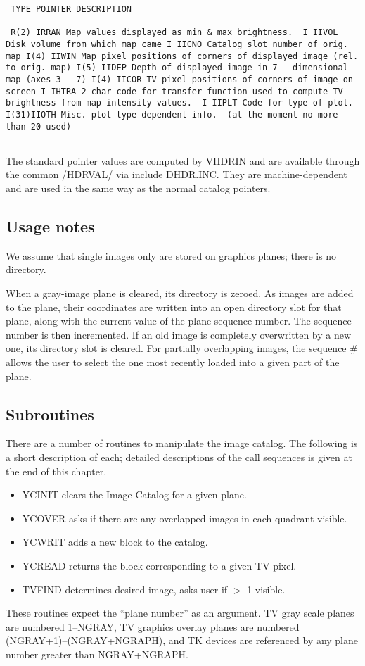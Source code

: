 \begin{verbatim}
 TYPE POINTER DESCRIPTION

 R(2) IRRAN Map values displayed as min & max brightness.  I IIVOL
Disk volume from which map came I IICNO Catalog slot number of orig.
map I(4) IIWIN Map pixel positions of corners of displayed image (rel.
to orig. map) I(5) IIDEP Depth of displayed image in 7 - dimensional
map (axes 3 - 7) I(4) IICOR TV pixel positions of corners of image on
screen I IHTRA 2-char code for transfer function used to compute TV
brightness from map intensity values.  I IIPLT Code for type of plot.
I(31)IIOTH Misc. plot type dependent info.  (at the moment no more
than 20 used)


\end{verbatim}
The standard pointer values are computed by VHDRIN and are available
through the common /HDRVAL/ via include DHDR.INC.  They are
machine-dependent and are used in the same way as the normal catalog
pointers.


\subsection{Usage notes}
We assume that single images only are stored on graphics planes; there
is no directory.

When a gray-image plane is cleared, its directory is zeroed. As images
are added to the plane, their coordinates are written into an open
directory slot for that plane, along with the current value of the
plane sequence number.  The sequence number is then incremented.  If
an old image is completely overwritten by a new one, its directory
slot is cleared.  For partially overlapping images, the sequence \#
allows the user to select the one most recently loaded into a given
part of the plane.


\subsection{Subroutines}
There are a number of routines to manipulate the image catalog.  The
following is a short description of each; detailed descriptions of the
call sequences is given at the end of this chapter.
\begin{itemize} %
\item YCINIT  clears the Image Catalog for a given plane.
\item YCOVER asks if there are any overlapped images in each quadrant
visible.
\item YCWRIT  adds a new block to the catalog.
\item YCREAD  returns the block corresponding to a given TV pixel.
\item TVFIND  determines desired image, asks user if $>$ 1 visible.
\end{itemize} %
These routines expect the ``plane number'' as an argument.  TV gray
scale planes are numbered 1--NGRAY, TV graphics overlay planes are
numbered (NGRAY+1)--(NGRAY+NGRAPH), and TK devices are referenced by
any plane number greater than NGRAY+NGRAPH.


